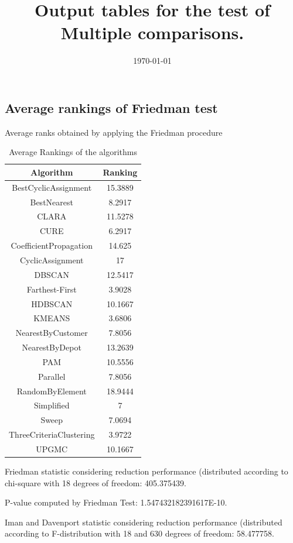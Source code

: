 \documentclass[a4paper,10pt]{article}
\title{Output tables for the test of Multiple comparisons.}
\author{}
\date{\today}
\begin{document}
\begin{landscape}
\pagestyle{empty}
\maketitle
\thispagestyle{empty}
\section{Average rankings of Friedman test}



Average ranks obtained by applying the Friedman procedure

\begin{table}[!htp]
\centering
\begin{tabular}{|c|c|}\hline
Algorithm&Ranking\\\hline
BestCyclicAssignment & 15.3889\\
BestNearest & 8.2917\\
CLARA & 11.5278\\
CURE & 6.2917\\
CoefficientPropagation & 14.625\\
CyclicAssignment & 17\\
DBSCAN & 12.5417\\
Farthest-First & 3.9028\\
HDBSCAN & 10.1667\\
KMEANS & 3.6806\\
NearestByCustomer & 7.8056\\
NearestByDepot & 13.2639\\
PAM & 10.5556\\
Parallel & 7.8056\\
RandomByElement & 18.9444\\
Simplified & 7\\
Sweep & 7.0694\\
ThreeCriteriaClustering & 3.9722\\
UPGMC & 10.1667\\
\hline
\end{tabular}
\caption{Average Rankings of the algorithms}
\end{table}

Friedman statistic considering reduction performance (distributed according to chi-square with 18 degrees of freedom: 405.375439.

P-value computed by Friedman Test: 1.547432182391617E-10.\newline

Iman and Davenport statistic considering reduction performance (distributed according to F-distribution with 18 and 630 degrees of freedom: 58.477758.


\end{landscape}
\end{document}
